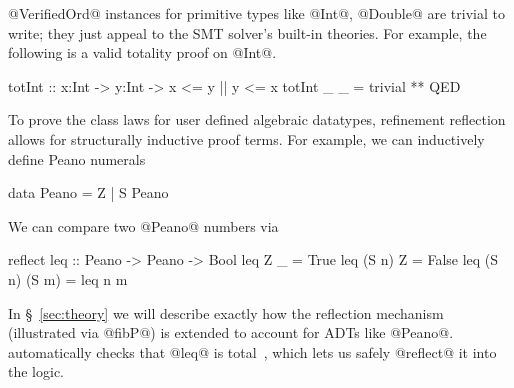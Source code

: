 




@VerifiedOrd@ instances for primitive types like @Int@, @Double@ are trivial to
write; they just appeal to the SMT solver's built-in theories.
%
For example, the following is a valid totality proof on @Int@.
\begin{code}
totInt :: x:Int -> y:Int -> {x <= y || y <= x}
totInt _ _ = trivial ** QED
\end{code}

%
To prove the class laws for user defined algebraic datatypes,
refinement reflection allows for structurally inductive proof terms.
%
For example, we can inductively define Peano numerals
%
\begin{code}
  data Peano = Z | S Peano
\end{code}
%
We can compare two @Peano@ numbers via
\begin{code}
  reflect leq :: Peano -> Peano -> Bool
  leq Z _         = True
  leq (S n) Z     = False
  leq (S n) (S m) = leq n m
\end{code}
%
In \S~\ref{sec:theory} we will describe
exactly how the reflection mechanism (illustrated
via @fibP@) is extended to account for ADTs like @Peano@.
%
\toolname automatically checks
that @leq@ is total~\citep{Vazou14}, which
lets us safely @reflect@ it into the logic.

